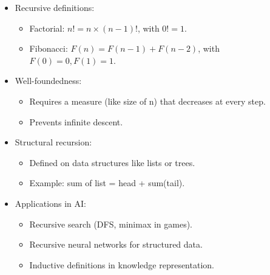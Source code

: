 \documentclass[
  letterpaper,
  DIV=11,
  numbers=noendperiod]{scrreprt}
\providecommand{\tightlist}{%
  \setlength{\itemsep}{0pt}\setlength{\parskip}{0pt}}
\begin{document}
\begin{itemize}
\item
  Recursive definitions:

  \begin{itemize}
  \tightlist
  \item
    Factorial: \(n! = n \times (n-1)!\), with \(0! = 1\).
  \item
    Fibonacci: \(F(n) = F(n-1) + F(n-2)\), with \(F(0)=0, F(1)=1\).
  \end{itemize}
\item
  Well-foundedness:

  \begin{itemize}
  \tightlist
  \item
    Requires a measure (like size of n) that decreases at every step.
  \item
    Prevents infinite descent.
  \end{itemize}
\item
  Structural recursion:

  \begin{itemize}
  \tightlist
  \item
    Defined on data structures like lists or trees.
  \item
    Example: sum of list = head + sum(tail).
  \end{itemize}
\item
  Applications in AI:

  \begin{itemize}
  \tightlist
  \item
    Recursive search (DFS, minimax in games).
  \item
    Recursive neural networks for structured data.
  \item
    Inductive definitions in knowledge representation.
  \end{itemize}
\end{itemize}
\end{document}
